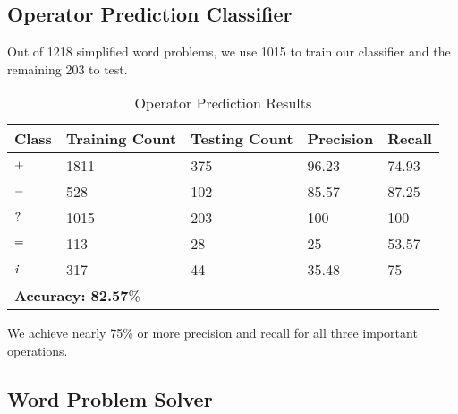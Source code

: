 \documentclass[11pt]{article}
\begin{document}
\subsection{Operator Prediction Classifier}
Out of 1218 simplified word problems, we use 1015 to train our classifier and the remaining 203 to test. 

\begin{table}[h!]
\centering
\begin{tabular}{|m{0.6cm}|m{1.2cm}|m{1.2cm}|m{1.2cm}|m{0.8cm}|}
\hline
\textbf{\small Class} & \textbf{\small Training Count} & \textbf{\small Testing Count} & \textbf{\small Precision} & \textbf{\small Recall} \\ \hline
$\mathit{\small +}$ & \small 1811 & \small 375 & \small 96.23 & \small 74.93 \\ \hline
$\mathit{\small -}$ & \small 528 & \small 102 & \small 85.57 & \small 87.25 \\ \hline
$\mathit{\small ?}$ & \small 1015 & \small 203 & \small 100 & \small 100 \\ \hline
$\mathit{\small =}$ & \small 113 & \small 28 & \small 25 & \small 53.57 \\ \hline
$\mathit{\small i}$ & \small 317 & \small 44 & \small 35.48 & \small 75 \\ \hline
\multicolumn{5}{|m{7cm}|}{\textbf{\small Accuracy: 82.57}\%} \\ \hline
\end{tabular}
\caption{Operator Prediction Results}
\label{figure:13}
\end{table}
\vspace{0.15cm}
We achieve nearly 75\% or more precision and recall for all three important operations.

\subsection{Word Problem Solver}
\end{document}
